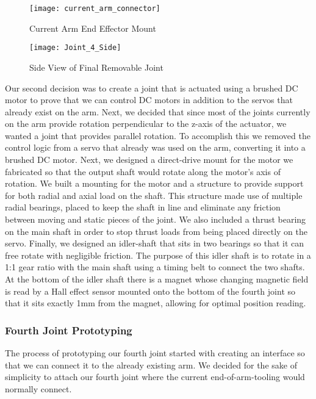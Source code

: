 \begin{figure}[H]
	\centering
	\texttt{[image: current\_arm\_connector]}
	\caption{Current Arm End Effector Mount}
	\label{Current Arm Encoder Mount}
\end{figure}

\begin{figure}[H]
	\centering
	\texttt{[image: Joint\_4\_Side]}
	\caption{Side View of Final Removable Joint}
	\label{fig:Side View of Joint 4}
\end{figure}

\noindent Our second decision was to create a joint that is actuated using a brushed DC motor to prove that we can control DC motors in addition to the servos that already exist on the arm.  Next, we decided that since most of the joints currently on the arm provide rotation perpendicular to the z-axis of the actuator, we wanted a joint that provides parallel rotation. To accomplish this we removed the control logic from a servo that already was used on the arm, converting it into a brushed DC motor. Next, we designed a direct-drive mount for the motor we fabricated so that the output shaft would rotate along the motor's axis of rotation.  We built a mounting for the motor and a structure to provide support for both radial and axial load on the shaft. This structure made use of multiple radial bearings, placed to keep the shaft in line and eliminate any friction between moving and static pieces of the joint.  We also included a thrust bearing on the main shaft in order to stop thrust loads from being placed directly on the servo.  Finally, we designed an idler-shaft that sits in two bearings so that it can free rotate with negligible friction. The purpose of this idler shaft is to rotate in a 1:1 gear ratio with the main shaft using a timing belt to connect the two shafts.  At the bottom of the idler shaft there is a magnet whose changing magnetic field is read by a Hall effect sensor mounted onto the bottom of the fourth joint so that it sits exactly 1mm from the magnet, allowing for optimal position reading.  \\

\subsubsection{Fourth Joint Prototyping}
The process of prototyping our fourth joint started with creating an interface so that we can connect it to the already existing arm.  We decided for the sake of simplicity to attach our fourth joint where the current end-of-arm-tooling would normally connect. %

